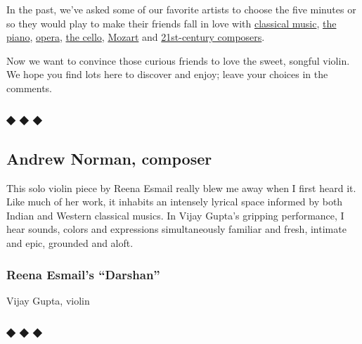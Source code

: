 In the past, we've asked some of our favorite artists to choose the five
minutes or so they would play to make their friends fall in love with
\href{https://www.nytimes3xbfgragh.onion/2018/09/06/arts/music/5-minutes-that-will-make-you-love-classical-music.html}{classical
music},
\href{https://www.nytimes3xbfgragh.onion/2019/04/19/arts/music/classical-music-piano.html}{the
piano},
\href{https://www.nytimes3xbfgragh.onion/2020/04/28/arts/music/classical-music-opera.html}{opera},
\href{https://www.nytimes3xbfgragh.onion/2020/06/03/arts/music/five-minutes-classical-music-cello.html}{the
cello},
\href{https://www.nytimes3xbfgragh.onion/2020/07/01/arts/music/classical-music-mozart.html}{Mozart}
and
\href{https://www.nytimes3xbfgragh.onion/2020/08/05/arts/music/five-minutes-classical-music.html}{21st-century
composers}.

Now we want to convince those curious friends to love the sweet, songful
violin. We hope you find lots here to discover and enjoy; leave your
choices in the comments.

\hypertarget{--}{%
\subsubsection{◆ ◆ ◆}\label{--}}

\hypertarget{andrew-norman-composer}{%
\subsection{Andrew Norman, composer}\label{andrew-norman-composer}}

This solo violin piece by Reena Esmail really blew me away when I first
heard it. Like much of her work, it inhabits an intensely lyrical space
informed by both Indian and Western classical musics. In Vijay Gupta's
gripping performance, I hear sounds, colors and expressions
simultaneously familiar and fresh, intimate and epic, grounded and
aloft.

\hypertarget{reena-esmails-darshan}{%
\subsubsection{Reena Esmail's ``Darshan''}\label{reena-esmails-darshan}}

Vijay Gupta, violin

\hypertarget{---1}{%
\subsubsection{◆ ◆ ◆}\label{---1}}

